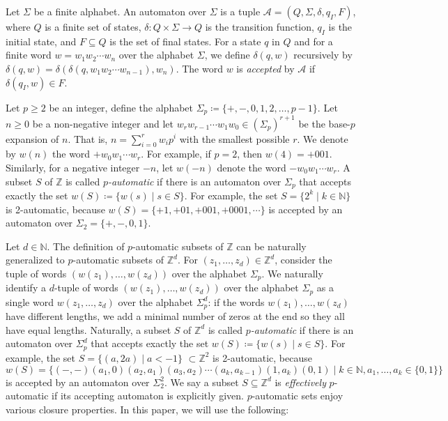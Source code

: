 \documentclass[a4paper,UKenglish,cleveref, autoref, thm-restate]{lipics-v2021}
\newcommand{\Z}{\mathbb{Z}}
\newcommand{\N}{\mathbb{N}}
\newcommand{\mA}{\mathcal{A}}
\theoremstyle{definition}
\theoremstyle{definition}
\theoremstyle{definition}
\begin{document}
Let $\Sigma$ be a finite alphabet. An automaton over $\Sigma$ is a tuple $\mA = (Q, \Sigma, \delta, q_I, F)$,
where $Q$ is a finite set of states, $\delta \colon Q \times \Sigma \rightarrow Q$ is the transition function, $q_I$ is the initial state, and $F \subseteq Q$ is the set of final states.
For a state $q$ in $Q$ and for a finite word $w = w_1 w_2 \cdots w_n$ over the alphabet $\Sigma$, we define $\delta(q, w)$ recursively by $\delta(q, w) = \delta(\delta(q, w_1 w_2 \cdots w_{n-1}), w_n)$. 
The word $w$ is \emph{accepted} by $\mA$ if $\delta(q_I, w) \in F$.

Let $p \geq 2$ be an integer, define the alphabet $\Sigma_p \coloneqq \{+, -, 0, 1, 2, \ldots, p-1\}$.
Let $n \geq 0$ be a non-negative integer and let $w_r w_{r-1} \cdots w_1 w_0 \in (\Sigma_p)^{r+1}$ be the base-$p$ expansion of $n$. 
That is, $n = \sum_{i = 0}^r w_i p^i$ with the smallest possible $r$. 
We denote by $w(n)$ the word $+ w_0 w_1 \cdots w_r$.
For example, if $p = 2$, then $w(4) = +001$.
Similarly, for a negative integer $-n$, let $w(-n)$ denote the word $- w_0 w_1 \cdots w_r$. 
A subset $S$ of $\Z$ is called \emph{$p$-automatic} if there is an automaton over $\Sigma_p$ that accepts exactly the set $w(S) \coloneqq \{w(s) \mid s \in S\}$.
For example, the set $S = \{2^k \mid k \in \N\}$ is 2-automatic, because $w(S) = \{+1, +01, +001, +0001, \cdots \}$ is accepted by an automaton over $\Sigma_2 = \{+, -, 0, 1\}$.

Let $d \in \N$. The definition of $p$-automatic subsets of $\Z$ can be naturally generalized to $p$-automatic subsets of $\Z^d$.
For $(z_1, \ldots, z_d) \in \Z^d$, consider the tuple of words $(w(z_1), \ldots, w(z_d))$ over the alphabet $\Sigma_p$.
We naturally identify a $d$-tuple of words $(w(z_1), \ldots, w(z_d))$ over the alphabet $\Sigma_p$ as a single word $w(z_1, \ldots, z_d)$ over the alphabet $\Sigma_p^d$: if the words $w(z_1), \ldots, w(z_d)$ have different lengths, we add a minimal number of zeros at the end so they all have equal lengths.
Naturally, a subset $S$ of $\Z^d$ is called \emph{$p$-automatic} if there is an automaton over $\Sigma_p^d$ that accepts exactly the set $w(S) \coloneqq \{w(s) \mid s \in S\}$.
For example, the set $S = \{(a, 2a) \mid a < -1\}$ $\subset \Z^2$ is 2-automatic, because 
\[
w(S) = \{(-, -)(a_1, 0)(a_2, a_1)(a_3, a_2) \cdots (a_k, a_{k-1}) (1, a_k) (0, 1) \mid k \in \N, a_1, \ldots, a_k \in \{0, 1\}\}
\]
is accepted by an automaton over $\Sigma_2^2$.
We say a subset $S \subseteq \Z^d$ is \emph{effectively} $p$-automatic if its accepting automaton is explicitly given.
$p$-automatic sets enjoy various closure properties.
In this paper, we will use the following:
\end{document}
